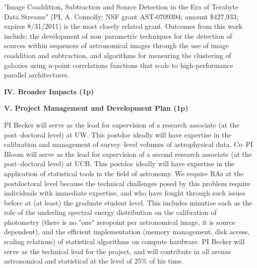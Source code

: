  \smallskip

"Image Coaddition, Subtraction and Source Detection in the Era of Terabyte Data
Streams" (PI, A. Connolly; NSF grant AST-0709394; amount \$427,933; expires
8/31/2011) is the most closely related grant.  Outcomes from this work include:
the development of non--parametric techniques for the detection of sources
within sequences of astronomical images through the use of image coaddition and
subtraction, and algorithms for measuring the clustering of galaxies using
n-point correlations functions that scale to high-performance parallel
architectures.

\bigskip \centerline{\bf IV. Broader Impacts (1p)} \smallskip \smallskip



\bigskip \centerline{\bf V. Project Management and Development Plan (1p)}
\smallskip

PI Becker will serve as the lead for supervision of a research associate (at the
post--doctoral level) at UW.  This postdoc ideally will have expertise in the
calibration and management of survey--level volumes of astrophysical data.
Co--PI Bloom will serve as the lead for supervision of a second research
associate (at the post--doctoral level) at UCB.  This postdoc ideally will have
expertise in the application of statistical tools in the field of astronomy.  We
require RAs at the postdoctoral level because the technical challenges posed by
this problem require individuals with immediate expertise, and who have fought
through such issues before at (at least) the graduate student level. This
includes minutiae such as the role of the underling spectral energy distribution
on the calibration of photometry (there is no "one" zeropoint per astronomical
image, it is source dependent), and the efficient implementation (memory
management, disk access, scaling relations) of statistical algorithms on compute
hardware. PI Becker will serve as the technical lead for the project, and will
contribute in all arenas astronomical and statistical at the level of 25\% of
his time.

